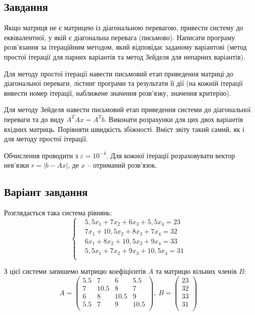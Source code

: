 \documentclass[a4paper,14pt]{extarticle} %
\begin{document}


\newpage

\subsection*{Завдання}

Якщо матриця не є матрицею із діагональною перевагою, привести систему до еквівалентної, у якій є 
діагональна перевага (письмово). Написати програму розв’язання за ітераційним методом, який відповідає 
заданому варіантові (метод простої ітерації для парних варіантів та метод Зейделя для непарних варіантів). 

Для методу простої ітерації навести письмовий етап приведення матриці до діагональної переваги, лістинг 
програми та результати її дії (на кожній ітерації вивести номер ітерації, наближене значення розв'язку, 
значення критерію). 

Для методу Зейделя навести письмовий етап приведення системи до діагональної переваги та до виду $A^TAx=A^Tb$. 
Виконати розрахунки для цих двох варіантів вхідних матриць. Порівняти швидкість збіжності. Вміст звіту такий 
самий, як і для методу простої ітерації.

Обчислення проводити з $\varepsilon =10^{-4}$. Для кожної ітерації розраховувати 
вектор нев’язки $r = |b - Ax|$, де $x$ -- отриманий розв’язок.

\subsection*{Варіант завдання}

Розглядається така система рівнянь:
\begin{equation}
    \left\{
    \begin{aligned}
        &5{,}5x_1 + 7x_2 + 6x_3 + 5{,}5x_4 = 23 \\
        &7x_1 + 10{,}5x_2 + 8x_3 + 7x_4 = 32 \\
        &6x_1 + 8x_2 + 10{,}5x_3 + 9x_4 = 33 \\
        &5{,}5x_1 + 7x_2 + 9x_3 + 10{,}5x_4 = 31 \\
    \end{aligned} \label{start equations}
    \right.
\end{equation}

З цієї системи запишемо матрицю коефіцієнтів $A$ та матрицю вільних членів $B$:
\[
A=
    \begin{pmatrix}
        5.5 & 7 & 6 & 5.5 \\
        7 & 10.5 & 8 & 7 \\
        6 & 8 & 10.5 & 9 \\
        5.5 & 7 & 9 & 10.5 \\
    \end{pmatrix},\
B = 
    \begin{pmatrix}
        23 \\
        32 \\
        33 \\
        31 \\
    \end{pmatrix}
\]
\end{document}
